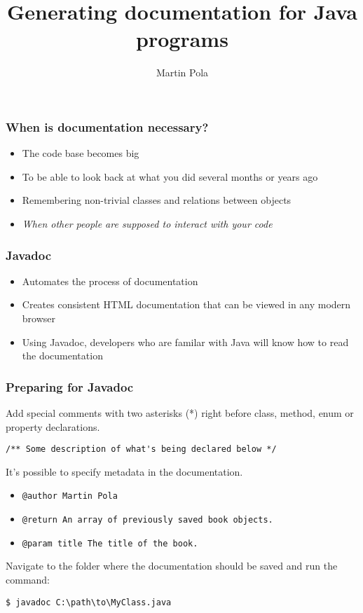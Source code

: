 \documentclass{beamer}
\title{Generating documentation for Java programs}
\author{Martin Pola}
\date{}
\begin{document}
	\maketitle
	
	\frame
	{
		\frametitle{When is documentation necessary?}

		\begin{itemize}
			\item The code base becomes big
			\item To be able to look back at what you did several months or years ago
			\item Remembering non-trivial classes and relations between objects
			\pause
			\item \emph{When other people are supposed to interact with your code}
		\end{itemize}
	}

	\begin{frame}
		\frametitle{Javadoc}
	
		\begin{itemize}
			\item Automates the process of documentation
			\item Creates consistent HTML documentation that can be viewed in any modern browser
			\item Using Javadoc, developers who are familar with Java will know how to read the documentation
		\end{itemize}
	\end{frame}

	\begin{frame}[fragile]
		\frametitle{Preparing for Javadoc}

		Add special comments with two asterisks (*) right before class, method, enum or property declarations.

		\begin{lstlisting}[style=customjava]
/** Some description of what's being declared below */\end{lstlisting}

		\pause
		It's possible to specify metadata in the documentation.

		\begin{itemize}
			\item \texttt{@author Martin Pola}
			\item \texttt{@return An array of previously saved book objects.}
			\item \texttt{@param title The title of the book.}
		\end{itemize}

		\pause
		Navigate to the folder where the documentation should be saved and run the command:
		\begin{lstlisting}
$ javadoc C:\path\to\MyClass.java\end{lstlisting}
	\end{frame}
\end{document}
